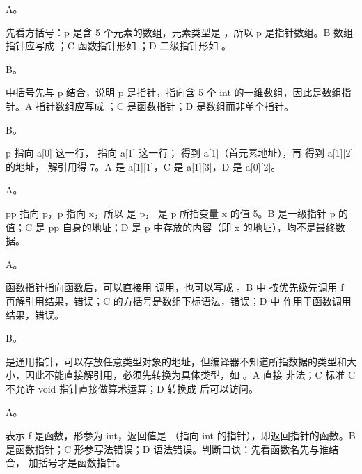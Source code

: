 \documentclass[a4paper,11pt]{article}
\begin{document}


\q A。\begin{analysis} 先看方括号：p 是含 5 个元素的数组，元素类型是 ，所以 p 是指针数组。B 数组指针应写成 ；C 函数指针形如 ；D 二级指针形如 。\end{analysis}

\q B。\begin{analysis} 中括号先与 p 结合，说明 p 是指针，指向含 5 个 int 的一维数组，因此是数组指针。A 指针数组应写成 ；C 是函数指针；D 是数组而非单个指针。\end{analysis}

\q B。\begin{analysis}p 指向 a[0] 这一行， 指向 a[1] 这一行； 得到 a[1]（首元素地址），再  得到 a[1][2] 的地址，\code{*} 解引用得 7。A 是 a[1][1]，C 是 a[1][3]，D 是 a[0][2]。\end{analysis}

\q A。\begin{analysis}pp 指向 p，p 指向 x，所以  是 p， 是 p 所指变量 x 的值 5。B 是一级指针 p 的值；C 是 pp 自身的地址；D 是 p 中存放的内容（即 x 的地址），均不是最终数据。\end{analysis}

\q A。\begin{analysis}函数指针指向函数后，可以直接用  调用，也可以写成 。B 中  按优先级先调用 f 再解引用结果，错误；C 的方括号是数组下标语法，错误；D 中 \code{\&} 作用于函数调用结果，错误。\end{analysis}

\q B。\begin{analysis} 是通用指针，可以存放任意类型对象的地址，但编译器不知道所指数据的类型和大小，因此不能直接解引用，必须先转换为具体类型，如 。A 直接  非法；C 标准 C 不允许 void 指针直接做算术运算；D 转换成  后可以访问。\end{analysis}

\q A。\begin{analysis} 表示 f 是函数，形参为 int，返回值是 （指向 int 的指针），即返回指针的函数。B 是函数指针；C 形参写法错误；D 语法错误。判断口诀：先看函数名先与谁结合， 加括号才是函数指针。\end{analysis}
\end{document}
